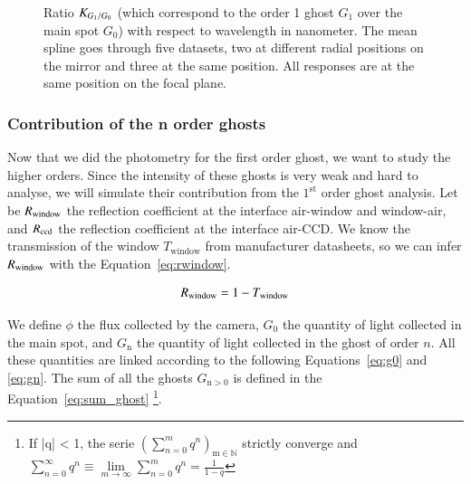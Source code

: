  \begin{figure}[h]
     \centering
     \caption{Ratio $K_{G_1/G_0}$ (which correspond to the order 1 ghost $G_{1}$ over the main spot $G_0$) with respect to wavelength in nanometer. The mean spline goes through five datasets, two at different radial positions on the mirror and three at the same position. All responses are at the same position on the focal plane.}
     \label{fig:ghost_ratio}
 \end{figure}
 
 \subsubsection{Contribution of the n order ghosts}

 Now that we did the photometry for the first order ghost, we want to study the higher orders. Since the intensity of these ghosts is very weak and hard to analyse, we will simulate their contribution from the $1^{\mathrm{st}}$ order ghost analysis. Let be $R_{\mathrm{window}}$ the reflection coefficient at the interface air-window and window-air, and $R_{\mathrm{ccd}}$ the reflection coefficient at the interface air-CCD. We know the transmission of the window $T_\mathrm{window}$ from manufacturer datasheets, so we can infer $R_{\mathrm{window}}$ with the Equation~\ref{eq:rwindow}.
 
\begin{equation}
    R_{\mathrm{window}} = 1 - T_\mathrm{window}
    \label{eq:rwindow}
\end{equation}

 
 We define $\phi$ the flux collected by the camera, $G_0$ the quantity of light collected in the main spot, and $G_\mathrm{n}$ the quantity of light collected in the ghost of order $n$. All these quantities are linked according to the following Equations~\ref{eq:g0} and \ref{eq:gn}. The sum of all the ghosts $G_{\mathrm{n>0}}$ is defined in the Equation~\ref{eq:sum_ghost}
 \footnote{If |q| < 1, the serie $\left( \sum_{n=0}^{m} q^n \right)_{\mathrm{m \in \mathbb{N}}}$ strictly converge and \\ $\sum_{n=0}^{\infty} q^n \equiv \lim\limits_{m \rightarrow \infty} \sum_{n=0}^{m} q^n = \frac{1}{1-q}$}. %

